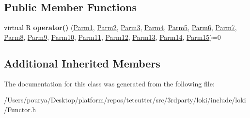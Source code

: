 \subsection*{Public Member Functions}
\begin{DoxyCompactItemize}
\item 
\hypertarget{classLoki_1_1FunctorImpl_3_01R_00_01_01_01_01_01_01_01_01_01_01_01_01_01_01_01_01_01_01_01_01_01853f8aa60d308affa006585da132e7c8_aa6276edbb6a07c068b2ef7edce1301aa}{}virtual R {\bfseries operator()} (\hyperlink{classLoki_1_1EmptyType}{Parm1}, \hyperlink{classLoki_1_1EmptyType}{Parm2}, \hyperlink{classLoki_1_1EmptyType}{Parm3}, \hyperlink{classLoki_1_1EmptyType}{Parm4}, \hyperlink{classLoki_1_1EmptyType}{Parm5}, \hyperlink{classLoki_1_1EmptyType}{Parm6}, \hyperlink{classLoki_1_1EmptyType}{Parm7}, \hyperlink{classLoki_1_1EmptyType}{Parm8}, \hyperlink{classLoki_1_1EmptyType}{Parm9}, \hyperlink{classLoki_1_1EmptyType}{Parm10}, \hyperlink{classLoki_1_1EmptyType}{Parm11}, \hyperlink{classLoki_1_1EmptyType}{Parm12}, \hyperlink{classLoki_1_1EmptyType}{Parm13}, \hyperlink{classLoki_1_1EmptyType}{Parm14}, \hyperlink{classLoki_1_1EmptyType}{Parm15})=0\label{classLoki_1_1FunctorImpl_3_01R_00_01_01_01_01_01_01_01_01_01_01_01_01_01_01_01_01_01_01_01_01_01853f8aa60d308affa006585da132e7c8_aa6276edbb6a07c068b2ef7edce1301aa}

\end{DoxyCompactItemize}
\subsection*{Additional Inherited Members}


The documentation for this class was generated from the following file\+:\begin{DoxyCompactItemize}
\item 
/\+Users/pourya/\+Desktop/platform/repos/tetcutter/src/3rdparty/loki/include/loki/Functor.\+h\end{DoxyCompactItemize}
